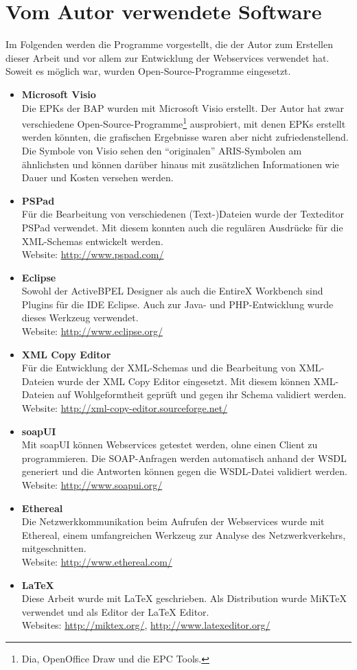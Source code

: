 \section{Vom Autor verwendete Software}
\label{sec:Werkzeuge}
Im Folgenden werden die Programme vorgestellt, die der Autor zum Erstellen dieser Arbeit und vor allem zur Entwicklung der Webservices verwendet hat. Soweit es möglich war, wurden Open-Source-Programme eingesetzt.

\begin{itemize}
\item \textbf{Microsoft Visio} \\
Die EPKs der BAP wurden mit Microsoft Visio erstellt. Der Autor hat zwar verschiedene Open-Source-Programme\footnote{Dia, OpenOffice Draw und die EPC Tools.} ausprobiert, mit denen EPKs erstellt werden könnten, die grafischen Ergebnisse waren aber nicht zufriedenstellend. Die Symbole von Visio sehen den "`originalen"' ARIS-Symbolen am ähnlichsten und können darüber hinaus mit zusätzlichen Informationen wie Dauer und Kosten versehen werden.
\item \textbf{PSPad} \\
Für die Bearbeitung von verschiedenen (Text-)Dateien wurde der Texteditor PSPad verwendet. Mit diesem konnten \zB auch die regulären Ausdrücke für die XML-Schemas entwickelt werden. \\
Website: \url{http://www.pspad.com/}  
\item \textbf{Eclipse} \\
Sowohl der ActiveBPEL Designer als auch die EntireX Workbench sind Plugins für die IDE Eclipse. Auch zur Java- und PHP-Entwicklung wurde dieses Werkzeug verwendet. \\
Website: \url{http://www.eclipse.org/}  
\item \textbf{XML Copy Editor} \\
Für die Entwicklung der XML-Schemas und die Bearbeitung von XML-Dateien wurde der XML Copy Editor eingesetzt. Mit diesem können \ua XML-Dateien auf Wohlgeformtheit geprüft und gegen ihr Schema validiert werden. \\
Website: \url{http://xml-copy-editor.sourceforge.net/}
\item \textbf{soapUI} \\
Mit soapUI können Webservices getestet werden, ohne einen Client zu programmieren. Die SOAP-Anfragen werden automatisch anhand der WSDL generiert und die Antworten können gegen die WSDL-Datei validiert werden. \\
Website: \url{http://www.soapui.org/}
\item \textbf{Ethereal} \\
Die Netzwerkkommunikation beim Aufrufen der Webservices wurde mit Ethereal, einem umfangreichen Werkzeug zur Analyse des Netzwerkverkehrs, mitgeschnitten. \\
Website: \url{http://www.ethereal.com/}
\item \textbf{\LaTeX} \\
Diese Arbeit wurde mit {\LaTeX} geschrieben. Als Distribution wurde MiKTeX verwendet und als Editor der LaTeX Editor. \\
Websites: \url{http://miktex.org/}, \url{http://www.latexeditor.org/}
\end{itemize}
